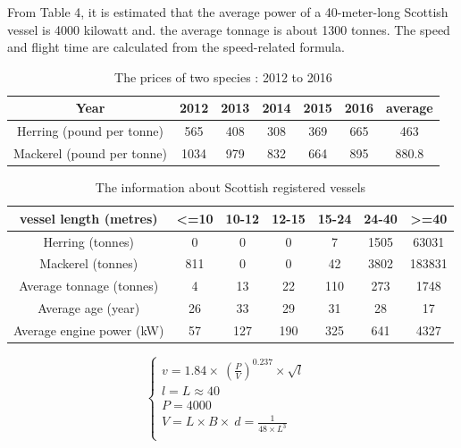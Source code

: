 \documentclass{mcmthesis}
\begin{document}
From Table 4, it is estimated that the average power of a 40-meter-long Scottish vessel is 4000 kilowatt and. the average tonnage is about 1300 tonnes. The speed and flight time are calculated from the speed-related formula.



\begin{table}[!htb]
\centering
\setlength{\abovecaptionskip}{0pt}%
\setlength{\belowcaptionskip}{13pt}%
\caption{The prices of two species : 2012 to 2016}
\begin{tabular}{ccccccc}
\toprule[1.5pt]
Year&2012&2013&2014&2015&2016&average\\
\bottomrule[1.5pt]
Herring (pound  per tonne)  &565&408&308&369&665&463\\
Mackerel (pound  per tonne)  &1034&979&832&664&895&880.8\\
\bottomrule[1.5pt]
\end{tabular}
\end{table}


\begin{table}[!htb]
\centering
\setlength{\abovecaptionskip}{0pt}%
\setlength{\belowcaptionskip}{13pt}%
\caption{The information about Scottish registered vessels}
\begin{tabular}{ccccccc}
\toprule[1.5pt]
vessel length (metres)&<=10&10-12&12-15&15-24&24-40&>=40\\
\bottomrule[1.5pt]
Herring (tonnes)&0&0&0&7&1505&63031\\
Mackerel (tonnes) &811&0&0&42&3802&183831\\
Average tonnage (tonnes)&4&13&22&110&273&1748\\
Average age (year)&26&33&29&31&28&17\\
Average engine power (kW)&57&127&190&325&641&4327\\

\bottomrule[1.5pt]
\end{tabular}
\end{table}



\begin{equation}
\left\{
\begin{array}{lr}
v=1.84\times \ (\frac{P}{V}) ^{0.237} \times \sqrt{l} &\\
l=L\approx 40 &\\
P=4000&\\
V=L\times B\times\ d =\frac{1}{48\times L^3}\\
\end{array}
\right.
\end{equation}
\end{document}
